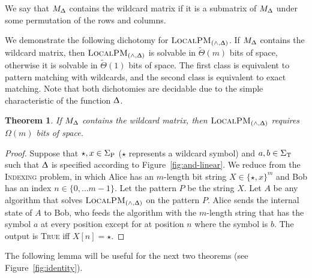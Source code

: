 \documentclass{article}
\renewcommand{\Delta}{\Updelta}
\newcommand{\TRUE}{\textsc{True}\xspace}
\newcommand{\indexing}{\textsc{Indexing}\xspace}
\newcommand{\SigmaP}{\ensuremath{\Sigma_{\textup{P}}}}
\newcommand{\SigmaT}{\ensuremath{\Sigma_{\textup{T}}}}
\newcommand{\local}{\ensuremath{\textsc{LocalPM}}}
\newcommand{\wildcard}{\ensuremath{\star}}
\theoremstyle{plain}
\newtheorem{theorem}{Theorem}[]
\theoremstyle{definition}
\begin{document}
We say that $M_{\Delta}$ contains the wildcard matrix if it is a submatrix of $M_{\Delta}$ under some permutation of the rows and columns.

We demonstrate the following dichotomy for $\local_{(\wedge,\Delta)}$. If $M_{\Delta}$ contains the wildcard matrix, then $\local_{(\wedge,\Delta)}$ is solvable in $\tilde{\Theta}(m)$ bits of space, otherwise it is solvable in $\tilde{\Theta}(1)$ bits of space. The first class is equivalent to pattern matching with wildcards, and the second class is equivalent to exact matching. Note that both dichotomies are decidable due to the simple characteristic of the function $\Delta$.

\begin{theorem}
    \label{thm:and-linear}
    If $M_{\Delta}$ contains the wildcard matrix, then $\local_{(\wedge,\Delta)}$ requires $\Omega(m)$ bits of space.
\end{theorem}
\begin{proof}
    Suppose that $\wildcard,x\in\SigmaP$ ($\wildcard$ represents a wildcard symbol) and $a,b\in\SigmaT$ such that $\Delta$ is specified according to Figure~\ref{fig:and-linear}. We reduce from the \indexing problem, in which Alice has an $m$-length bit string $X\in\{\wildcard,x\}^{m}$ and Bob has an index $n\in\{0,\ldots m-1\}$. Let the pattern $P$ be the string $X$. Let $A$ be any algorithm that solves $\local_{(\wedge,\Delta)}$ on the pattern $P$. Alice sends the internal state of $A$ to Bob, who feeds the algorithm with the $m$-length string that has the symbol $a$ at every position except for at position $n$ where the symbol is $b$. The output is \TRUE iff $X[n]=\wildcard$.
\end{proof}



\noindent The following lemma will be useful for the next two theorems (see Figure~\ref{fig:identity}).
\end{document}
